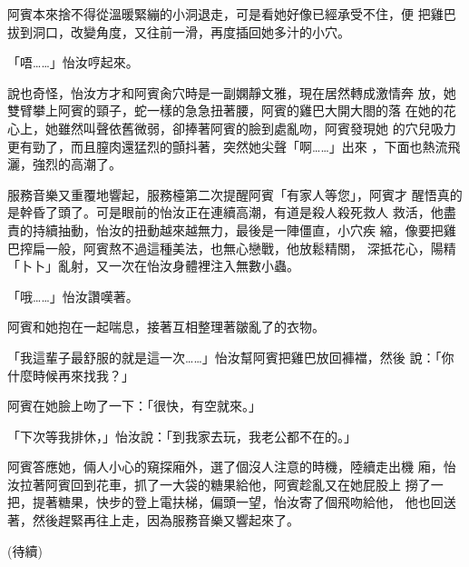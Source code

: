 阿賓本來捨不得從溫暖緊繃的小洞退走，可是看她好像已經承受不住，便
把雞巴拔到洞口，改變角度，又往前一滑，再度插回她多汁的小穴。

「唔……」怡汝哼起來。

說也奇怪，怡汝方才和阿賓肏穴時是一副嫻靜文雅，現在居然轉成激情奔
放，她雙臂攀上阿賓的頸子，蛇一樣的急急扭著腰，阿賓的雞巴大開大閤的落
在她的花心上，她雖然叫聲依舊微弱，卻捧著阿賓的臉到處亂吻，阿賓發現她
的穴兒吸力更有勁了，而且膣肉還猛烈的顫抖著，突然她尖聲「啊……」出來
，下面也熱流飛灑，強烈的高潮了。

服務音樂又重覆地響起，服務檯第二次提醒阿賓「有家人等您」，阿賓才
醒悟真的是幹昏了頭了。可是眼前的怡汝正在連續高潮，有道是殺人殺死救人
救活，他盡責的持續抽動，怡汝的扭動越來越無力，最後是一陣僵直，小穴疾
縮，像要把雞巴搾扁一般，阿賓熬不過這種美法，也無心戀戰，他放鬆精關，
深抵花心，陽精「卜卜」亂射，又一次在怡汝身體裡注入無數小蟲。

「哦……」怡汝讚嘆著。

阿賓和她抱在一起喘息，接著互相整理著皺亂了的衣物。

「我這輩子最舒服的就是這一次……」怡汝幫阿賓把雞巴放回褲襠，然後
說：「你什麼時候再來找我？」

阿賓在她臉上吻了一下：「很快，有空就來。」

「下次等我排休，」怡汝說：「到我家去玩，我老公都不在的。」

阿賓答應她，倆人小心的窺探廂外，選了個沒人注意的時機，陸續走出機
廂，怡汝拉著阿賓回到花車，抓了一大袋的糖果給他，阿賓趁亂又在她屁股上
撈了一把，提著糖果，快步的登上電扶梯，偏頭一望，怡汝寄了個飛吻給他，
他也回送著，然後趕緊再往上走，因為服務音樂又響起來了。

(待續)










